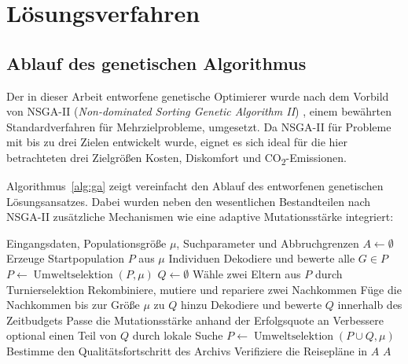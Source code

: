\section{Lösungsverfahren}
\label{sec:loesungsverfahren}

\subsection{Ablauf des genetischen Algorithmus}
\label{subsec:ablauf}

Der in dieser Arbeit entworfene genetische Optimierer wurde nach dem Vorbild von NSGA-II (\textit{Non-dominated Sorting Genetic Algorithm II}) \cite{nsga2}, einem bewährten Standardverfahren für Mehrzielprobleme, umgesetzt. Da NSGA-II für Probleme mit bis zu drei Zielen entwickelt wurde, eignet es sich ideal für die hier betrachteten drei Zielgrößen Kosten, Diskomfort und CO\textsubscript{2}-Emissionen.

Algorithmus~\ref{alg:ga} zeigt vereinfacht den Ablauf des entworfenen genetischen Lösungsansatzes. Dabei wurden neben den wesentlichen Bestandteilen nach NSGA-II zusätzliche Mechanismen wie eine adaptive Mutationsstärke integriert:


\begin{algorithm}[htbp]
  \caption{Genetischer Algorithmus zur Reiseplanung}
  \label{alg:ga}
  \begin{algorithmic}[1]
    \Require Eingangsdaten, Populationsgröße $\mu$, Suchparameter und Abbruchgrenzen
    \State $A \gets \emptyset$
    \State Erzeuge Startpopulation $P$ aus $\mu$ Individuen
    \State Dekodiere und bewerte alle $G \in P$
    \State $P \gets \operatorname{Umweltselektion}(P,\mu)$
      \State $Q \gets \emptyset$
        \State Wähle zwei Eltern aus $P$ durch Turnierselektion
        \State Rekombiniere, mutiere und repariere zwei Nachkommen
        \State Füge die Nachkommen bis zur Größe $\mu$ zu $Q$ hinzu
      \EndWhile
      \State Dekodiere und bewerte $Q$ innerhalb des Zeitbudgets
      \State Passe die Mutationsstärke anhand der Erfolgsquote an
      \State Verbessere optional einen Teil von $Q$ durch lokale Suche
      \State $P \gets \operatorname{Umweltselektion}(P \cup Q,\mu)$
      \State Bestimme den Qualitätsfortschritt des Archivs
    \EndWhile
    \State Verifiziere die Reisepläne in $A$
    \State \Return $A$ 
  \end{algorithmic}
\end{algorithm}

